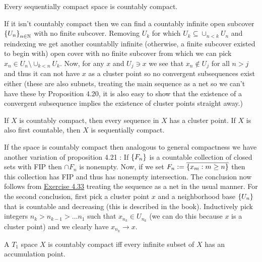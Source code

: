 \documentclass[12pt,a4paper]{article}
\begin{document}
\begin{problem}\label{prob:4-39}
Every sequentially compact space is countably compact.
\end{problem}
\begin{solution}
    If it isn't countably compact then we can find a countably infinite open subcover $ \qty{U_n}_{n\in\mathbb{N}}$ with no finite subcover. 
    Removing $U_k$ for which $U_k\subseteq\cup_{n<k}U_n$ and reindexing we get another countablly infinite (otherwise, a finite subcover existed to begin with) open cover with no finite subcover from which we can pick $x_n\in U_n\setminus\cup_{k<n}U_k.$ 
   Now, for any $x$ and $U_j\ni x$ we see that $x_n\notin U_j$ for all $n>j$ and thus it can not have $x$ as a cluster point so no convergent subsequences exist either (these are also subnets, treating the main sequence as a net so we can't have these by Proposition 4.20, it is also easy to show that the existence of a convergent subsequence implies the existence of cluster points straight away.)  
\end{solution}
\begin{problem}\label{prob:4-40}
If $X$ is countably compact, then every sequence in $X$ has a cluster point. If $X$ is also first countable, then $X$ is sequentially compact.
\end{problem}
\begin{solution}
If the space is countably compact then analogous to general compactness we have another variation of proposition 4.21 : If $ \qty{F_n}$ is a countable collection of closed sets with FIP then $\cap F_n$ is nonempty. 
Now, if we set $F_n:=\overline{\qty{x_m:m\geq n}}$ then this collection has FIP and thus has nonempty intersection. 
The conclusion now follows from \hyperref[prob:4-33]{Exercise 4.33} treating the sequence as a net in the usual manner. 
For the second conclusion, first pick a cluster point $x$ and a neighborhood base $ \qty{U_n}$ that is countable and decreasing (this is described in the book). 
Inductively pick integers $n_k>n_{k-1}>\ldots n_1$ such that $x_{n_k}\in U_{n_k}$ (we can do this because $x$ is a cluster point) and we clearly have $x_{n_k}\to x.$
\end{solution}
\begin{problem}\label{prob:4-41}
A $T_1$ space $X$ is countably compact iff every infinite subset of $X$ has an accumulation point.
\end{problem}
\end{document}
